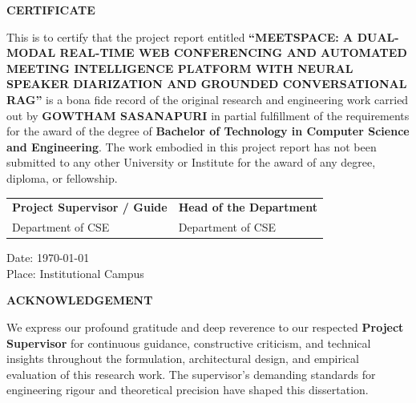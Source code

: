 \documentclass[12pt,oneside,letterpaper]{report}
\numberwithin{equation}{chapter} %
\begin{document}
\newpage
\begin{center}
{\fontsize{14pt}{18pt}\selectfont \textbf{CERTIFICATE}}\\[1.5cm]
\end{center}

\noindent This is to certify that the project report entitled \textbf{``MEETSPACE: A DUAL-MODAL REAL-TIME WEB CONFERENCING AND AUTOMATED MEETING INTELLIGENCE PLATFORM WITH NEURAL SPEAKER DIARIZATION AND GROUNDED CONVERSATIONAL RAG''} is a bona fide record of the original research and engineering work carried out by \textbf{GOWTHAM SASANAPURI} in partial fulfillment of the requirements for the award of the degree of \textbf{Bachelor of Technology in Computer Science and Engineering}. The work embodied in this project report has not been submitted to any other University or Institute for the award of any degree, diploma, or fellowship.

\vspace{4.0cm}

\noindent\begin{tabular}{p{7.0cm}p{7.0cm}}
\textbf{Project Supervisor / Guide} & \textbf{Head of the Department} \\
Department of CSE & Department of CSE \\
\end{tabular}

\vspace{3.0cm}
\noindent Date: \today \\
Place: Institutional Campus

\newpage
\begin{center}
{\fontsize{14pt}{18pt}\selectfont \textbf{ACKNOWLEDGEMENT}}\\[1.0cm]
\end{center}

\noindent We express our profound gratitude and deep reverence to our respected \textbf{Project Supervisor} for continuous guidance, constructive criticism, and technical insights throughout the formulation, architectural design, and empirical evaluation of this research work. The supervisor's demanding standards for engineering rigour and theoretical precision have shaped this dissertation.
\end{document}
